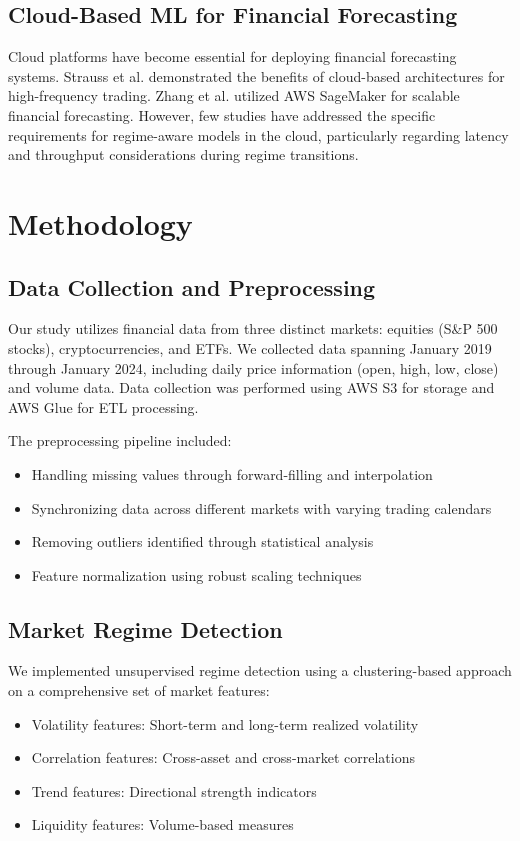 \documentclass[conference]{IEEEtran}
\begin{document}
\subsection{Cloud-Based ML for Financial Forecasting}
Cloud platforms have become essential for deploying financial forecasting systems. Strauss et al. \cite{strauss2018cloud} demonstrated the benefits of cloud-based architectures for high-frequency trading. Zhang et al. \cite{zhang2019scalable} utilized AWS SageMaker for scalable financial forecasting. However, few studies have addressed the specific requirements for regime-aware models in the cloud, particularly regarding latency and throughput considerations during regime transitions.

\section{Methodology}
\subsection{Data Collection and Preprocessing}
Our study utilizes financial data from three distinct markets: equities (S\&P 500 stocks), cryptocurrencies, and ETFs. We collected data spanning January 2019 through January 2024, including daily price information (open, high, low, close) and volume data. Data collection was performed using AWS S3 for storage and AWS Glue for ETL processing.

The preprocessing pipeline included:
\begin{itemize}
    \item Handling missing values through forward-filling and interpolation
    \item Synchronizing data across different markets with varying trading calendars
    \item Removing outliers identified through statistical analysis
    \item Feature normalization using robust scaling techniques
\end{itemize}

\subsection{Market Regime Detection}
We implemented unsupervised regime detection using a clustering-based approach on a comprehensive set of market features:
\begin{itemize}
    \item Volatility features: Short-term and long-term realized volatility
    \item Correlation features: Cross-asset and cross-market correlations
    \item Trend features: Directional strength indicators
    \item Liquidity features: Volume-based measures
\end{itemize}
\end{document}
